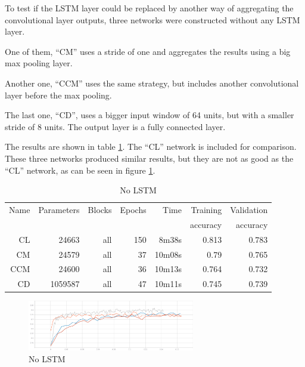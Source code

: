 To test if 
the LSTM layer could be replaced by 
another way of aggregating the convolutional layer outputs, three networks were constructed without any LSTM layer.

One of them, ``CM'' uses a stride of one and aggregates the results using a big max pooling layer.

Another one, ``CCM'' uses the same strategy, but includes another convolutional layer before the max pooling.

The last one, ``CD'', uses a bigger input window of 64 units, but with a smaller stride of 8 units. The output layer is a fully connected layer.

The results are shown in table \ref{tab:carvingnolstm}. The ``CL'' network is included for comparison.
These three networks produced similar results, but they are not as good as the ``CL'' network, as can be seen in figure
\ref{fig:nolstm}.


\begin{table}[!ht]
    \centering
    \caption{No LSTM}
    \label{tab:carvingnolstm}
\begin{tabular}{r|r|r|r|r|r|r}
\hline
Name & Parameters & Blocks & Epochs & Time & Training          & Validation          \\       
     &            &        &        &         &          accuracy &            accuracy \\ \hline\hline

CL & 24663  & all & 150 & 8m38s  & 0.813 & 0.783 \\ \hline
CM  & 24579   & all & 37 & 10m08s & 0.79  & 0.765 \\ \hline
CCM & 24600   & all & 36 & 10m13s & 0.764 & 0.732 \\ \hline
CD  & 1059587 & all & 47 & 10m11s & 0.745 & 0.739 \\ \hline
\end{tabular}
\end{table}

\begin{figure}[htb!]
\centering\includegraphics[width=0.65\textwidth]{content/nolstm.png}
\caption{\label{fig:nolstm}No LSTM}%
\end{figure}

